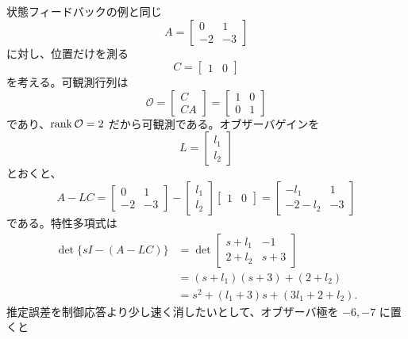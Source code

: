 状態フィードバックの例と同じ
\begin{equation}
  A=\begin{bmatrix}0&1\\-2&-3\end{bmatrix}
\end{equation}
に対し、位置だけを測る
\begin{equation}
  C=\begin{bmatrix}1&0\end{bmatrix}
\end{equation}
を考える。可観測行列は
\begin{equation}
  \mathcal{O}=\begin{bmatrix}C\\ CA\end{bmatrix}
  =\begin{bmatrix}1&0\\0&1\end{bmatrix}
\end{equation}
であり、$\operatorname{rank}\mathcal{O}=2$ だから可観測である。オブザーバゲインを
\begin{equation}
  L=\begin{bmatrix}l_1\\l_2\end{bmatrix}
\end{equation}
とおくと、
\begin{equation}
  A-LC
  =\begin{bmatrix}0&1\\-2&-3\end{bmatrix}
   -\begin{bmatrix}l_1\\l_2\end{bmatrix}
    \begin{bmatrix}1&0\end{bmatrix}
  =\begin{bmatrix}-l_1&1\\-2-l_2&-3\end{bmatrix}
\end{equation}
である。特性多項式は
\begin{align}
  \det\{sI-(A-LC)\}
  &=\det\begin{bmatrix}s+l_1&-1\\2+l_2&s+3\end{bmatrix}\\
  &=(s+l_1)(s+3)+(2+l_2)\\
  &=s^2+(l_1+3)s+(3l_1+2+l_2).
\end{align}
推定誤差を制御応答より少し速く消したいとして、オブザーバ極を $-6,-7$ に置くと
